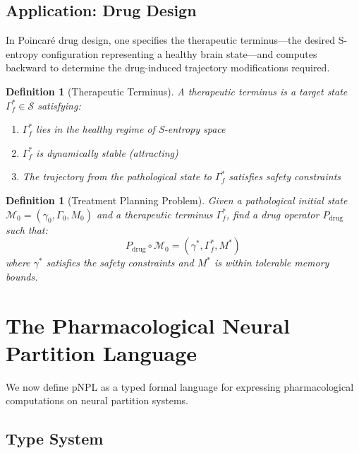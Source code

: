 \documentclass[10pt,twocolumn]{article}
\newtheorem{definition}[theorem]{Definition}
\theoremstyle{remark}
\newcommand{\Sspace}{\mathcal{S}}
\newcommand{\Pop}{P}
\newcommand{\Gstate}{\Gamma}
\newcommand{\Mstate}{\mathcal{M}}
\begin{document}
\subsection{Application: Drug Design}

In Poincar\'{e} drug design, one specifies the therapeutic terminus---the desired S-entropy configuration representing a healthy brain state---and computes backward to determine the drug-induced trajectory modifications required.

\begin{definition}[Therapeutic Terminus]
\label{def:therapeutic_terminus}
A therapeutic terminus is a target state $\Gstate_f^* \in \Sspace$ satisfying:
\begin{enumerate}[noitemsep]
\item $\Gstate_f^*$ lies in the healthy regime of S-entropy space
\item $\Gstate_f^*$ is dynamically stable (attracting)
\item The trajectory from the pathological state to $\Gstate_f^*$ satisfies safety constraints
\end{enumerate}
\end{definition}

\begin{definition}[Treatment Planning Problem]
\label{def:treatment}
Given a pathological initial state $\Mstate_0 = (\gamma_0, \Gstate_0, M_0)$ and a therapeutic terminus $\Gstate_f^*$, find a drug operator $\Pop_{\mathrm{drug}}$ such that:
\begin{equation}
\Pop_{\mathrm{drug}} \circ \Mstate_0 = (\gamma^*, \Gstate_f^*, M^*)
\end{equation}
where $\gamma^*$ satisfies the safety constraints and $M^*$ is within tolerable memory bounds.
\end{definition}

\section{The Pharmacological Neural Partition Language}
\label{sec:pnpl}

We now define pNPL as a typed formal language for expressing pharmacological computations on neural partition systems.

\subsection{Type System}
\end{document}

